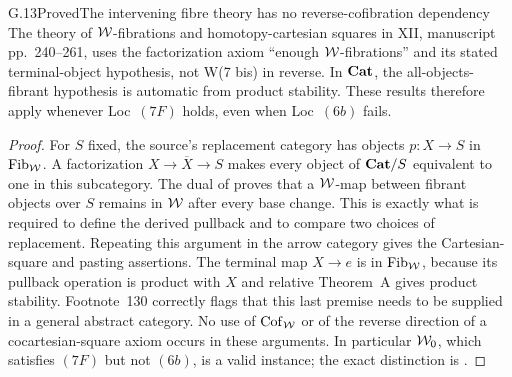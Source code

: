 \begin{claim}{G.13}{Proved}{The intervening fibre theory has no reverse-cofibration dependency}
The theory of $\mathcal{W}$-fibrations and homotopy-cartesian squares in XII, manuscript pp.~240--261, uses the factorization axiom ``enough $\mathcal{W}$-fibrations'' and its stated terminal-object hypothesis, not W(7 bis) in reverse. In $\mathbf{Cat}$, the all-objects-fibrant hypothesis is automatic from product stability. These results therefore apply whenever Loc~$(7F)$ holds, even when Loc~$(6b)$ fails.
\end{claim}
\begin{proof}
For $S$ fixed, the source's replacement category has objects $p:X\to S$ in $\operatorname{Fib}_{\mathcal{W}}$. A factorization $X\to\overline X\to S$ makes every object of $\mathbf{Cat}/S$ equivalent to one in this subcategory. The dual of  proves that a $\mathcal{W}$-map between fibrant objects over $S$ remains in $\mathcal{W}$ after every base change. This is exactly what is required to define the derived pullback and to compare two choices of replacement. Repeating this argument in the arrow category gives the Cartesian-square and pasting assertions. The terminal map $X\to e$ is in $\operatorname{Fib}_{\mathcal{W}}$, because its pullback operation is product with $X$ and relative Theorem~A gives product stability. Footnote~130 correctly flags that this last premise needs to be supplied in a general abstract category. No use of $\operatorname{Cof}_{\mathcal{W}}$ or of the reverse direction of a cocartesian-square axiom occurs in these arguments. In particular $\mathcal{W}_0$, which satisfies $(7F)$ but not $(6b)$, is a valid instance; the exact distinction is .
\end{proof}

